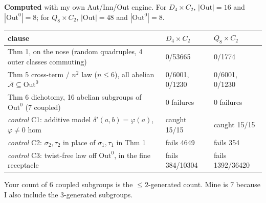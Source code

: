\documentclass[10pt]{article}
\newcommand{\Out}{\mathrm{Out}}
\begin{document}
\textbf{Computed} with my own Aut/Inn/Out engine. For $D_4\times C_2$, $|\Out|=16$ and $|\Out^0|=8$; for $Q_8\times C_2$, $|\Out|=48$ and $|\Out^0|=8$.
\begin{center}\footnotesize
\begin{tabular}{@{}lll@{}}
\toprule
clause & $D_4\times C_2$ & $Q_8\times C_2$\\\midrule
Thm 1, on the nose (random quadruples, 4 outer classes commuting) & 0/53665 & 0/1774\\
Thm 5 cross-term / $n^2$ law ($n\le6$), all abelian $\bar{\mathcal A}\subseteq\Out^0$ & 0/6001, 0/1230 & 0/6001, 0/1230\\
Thm 6 dichotomy, 16 abelian subgroups of $\Out^0$ (7 coupled) & 0 failures & 0 failures\\\midrule
\emph{control} C1: additive model $\delta'(a,b)=\varphi(a)$, $\varphi\ne0$ hom & caught 15/15 & caught 15/15\\
\emph{control} C2: $\sigma_2,\tau_2$ in place of $\sigma_1,\tau_1$ in Thm 1 & fails 4649 & fails 354\\
\emph{control} C3: twist-free law off $\Out^0$, in the fine receptacle & fails 384/10304 & fails 1392/36420\\
\bottomrule
\end{tabular}
\end{center}
Your count of 6 coupled subgroups is the $\le2$-generated count. Mine is 7 because I also include the 3-generated subgroups.
\end{document}
